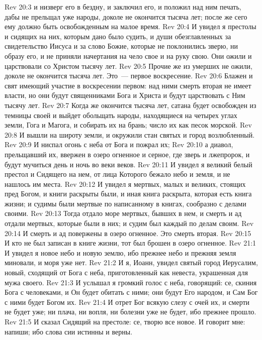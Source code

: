 \vs Rev 20:3 и низверг его в бездну, и заключил его, и положил над ним печать, дабы не прельщал уже народы, доколе не окончится тысяча лет; после же сего ему должно быть освобожденным на малое время.
\rsbpar\vs Rev 20:4 И увидел я престолы и сидящих на них, которым дано было судить, и души обезглавленных за свидетельство Иисуса и за слово Божие, которые не поклонились зверю, ни образу его, и не приняли начертания на чело свое и на руку свою. Они ожили и царствовали со Христом тысячу лет.
\vs Rev 20:5 Прочие же из умерших не ожили, доколе не окончится тысяча лет. Это~--- первое воскресение.
\vs Rev 20:6 Блажен и свят имеющий участие в воскресении первом: над ними смерть вторая не имеет власти, но они будут священниками Бога и Христа и будут царствовать с Ним тысячу лет.
\rsbpar\vs Rev 20:7 Когда же окончится тысяча лет, сатана будет освобожден из темницы своей и выйдет обольщать народы, находящиеся на четырех углах земли, Гога и Магога, и собирать их на брань; число их как песок морской.
\vs Rev 20:8 И вышли на широту земли, и окружили стан святых и город возлюбленный.
\vs Rev 20:9 И ниспал огонь с неба от Бога и пожрал их;
\vs Rev 20:10 а диавол, прельщавший их, ввержен в озеро огненное и серное, где зверь и лжепророк, и будут мучиться день и ночь во веки веков.
\rsbpar\vs Rev 20:11 И увидел я великий белый престол и Сидящего на нем, от лица Которого бежало небо и земля, и не нашлось им места.
\vs Rev 20:12 И увидел я мертвых, малых и великих, стоящих пред Богом, и книги раскрыты были, и иная книга раскрыта, которая есть книга жизни; и судимы были мертвые по написанному в книгах, сообразно с делами своими.
\vs Rev 20:13 Тогда отдало море мертвых, бывших в нем, и смерть и ад отдали мертвых, которые были в них; и судим был каждый по делам своим.
\vs Rev 20:14 И смерть и ад повержены в озеро огненное. Это смерть вторая.
\vs Rev 20:15 И кто не был записан в книге жизни, тот был брошен в озеро огненное.
\vs Rev 21:1 И увидел я новое небо и новую землю, ибо прежнее небо и прежняя земля миновали, и моря уже нет.
\vs Rev 21:2 И я, Иоанн, увидел святый город Иерусалим, новый, сходящий от Бога с неба, приготовленный как невеста, украшенная для мужа своего.
\vs Rev 21:3 И услышал я громкий голос с неба, говорящий: се, скиния Бога с человеками, и Он будет обитать с ними; они будут Его народом, и Сам Бог с ними будет Богом их.
\vs Rev 21:4 И отрет Бог всякую слезу с очей их, и смерти не будет уже; ни плача, ни вопля, ни болезни уже не будет, ибо прежнее прошло.
\vs Rev 21:5 И сказал Сидящий на престоле: се, творю все новое. И говорит мне: напиши; ибо слова сии истинны и верны.
